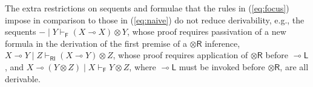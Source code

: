 \documentclass[copyright,creativecommons]{eptcs}
\theoremstyle{definition}
\newcommand{\tr}{\otimes \mathsf{R}}
\newcommand{\lleft}{{\multimap}\mathsf{L}}
\newcommand{\ot}{\otimes}
\newcommand{\lolli}{\multimap}
\newcommand{\RI}{\mathsf{RI}}
\newcommand{\F}{\mathsf{F}}
\begin{document}
 The extra restrictions on sequents and formulae that the rules in (\ref{eq:focus}) impose in comparison to those in (\ref{eq:naive}) do not reduce derivability, e.g., the sequents ${-} \mid Y \vdash_{\F} (X \lolli X) \ot Y$, whose proof requires passivation of a new formula in the derivation of the first premise of a $\tr$ inference, $X \lolli Y \mid Z \vdash_{\RI} (X \lolli Y) \ot Z$, whose proof requires application of $\tr$ before $\lleft$,
 and $X \lolli (Y \ot Z) \mid X \vdash_\F Y \ot Z$, where $\lleft$ must be invoked before $\tr$, are all derivable.
\end{document}
